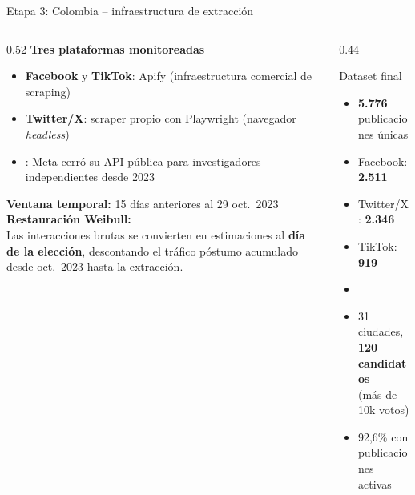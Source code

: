 \setcounter{framenumber}{18}
\makered
\begin{frame}{Etapa 3: Colombia -- infraestructura de extracción}
  \begin{columns}[T]
    \begin{column}{0.52\textwidth}
      \textbf{Tres plataformas monitoreadas}
      \begin{itemize}
        \item \textbf{Facebook} y \textbf{TikTok}: Apify (infraestructura comercial de scraping)
        \item \textbf{Twitter/X}: scraper propio con Playwright (navegador \textit{headless})
        \item {}: Meta cerró su API pública para investigadores
              independientes desde 2023
      \end{itemize}
      \vspace{0.3em}
      \textbf{Ventana temporal:} 15 días anteriores al 29 oct.\ 2023
      \vspace{0.3em}
      {\small\textbf{Restauración Weibull:}\\
      Las interacciones brutas se convierten en estimaciones al \textbf{día de la elección},
      descontando el tráfico póstumo acumulado desde oct.\ 2023 hasta la extracción.}
    \end{column}
    \begin{column}{0.44\textwidth}
      \begin{block}{Dataset final}
        \begin{itemize}\small
          \item \textbf{5.776} publicaciones únicas
          \item \hspace{1em} Facebook: \textbf{2.511}
          \item \hspace{1em} Twitter/X: \textbf{2.346}
          \item \hspace{1em} TikTok: \textbf{919}
          \item[\phantom{x}]
          \item 31 ciudades, \textbf{120 candidatos}\\
                (más de 10k votos)
          \item 92,6\% con publicaciones activas
        \end{itemize}
      \end{block}
    \end{column}
  \end{columns}
\end{frame}
\makeblue

